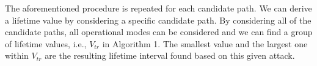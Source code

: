 The aforementioned procedure is repeated for each candidate path. We can derive a lifetime value by considering a specific candidate path. By considering all of the candidate
paths, all operational modes can be considered and we can find a group of lifetime values, i.e., $V_{tr}$ in Algorithm 1. The smallest value and the largest one within $V_{tr}$ are the resulting lifetime interval found based on this given attack.